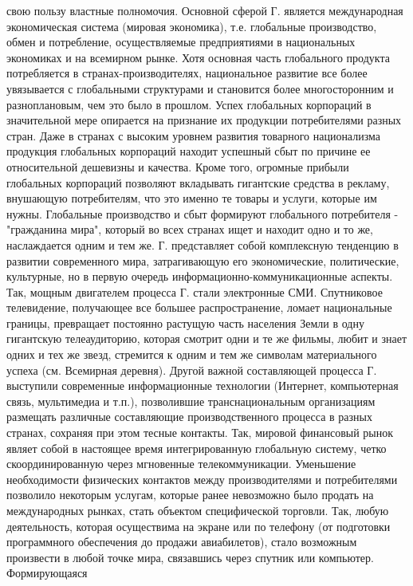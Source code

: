 \documentclass[12pt]{article}
\begin{document}
свою  пользу  властные  полномочия.  Основной  сферой  Г.  является  международная  экономическая  система
(мировая экономика), т.е. глобальные производство, обмен и потребление, осуществляемые предприятиями в
национальных экономиках и на всемирном рынке. Хотя основная часть глобального продукта потребляется в
странах-производителях,  национальное  развитие  все  более  увязывается  с  глобальными  структурами  и
становится более многосторонним и разноплановым, чем это было в прошлом. Успех глобальных корпораций в
значительной мере опирается на признание их продукции потребителями разных стран. Даже в странах с
высоким  уровнем  развития товарного национализма продукция  глобальных корпораций  находит  успешный
сбыт  по  причине  ее  относительной  дешевизны  и  качества.  Кроме  того,  огромные  прибыли  глобальных
корпораций позволяют вкладывать гигантские средства в рекламу, внушающую потребителям, что это именно
те товары и услуги, которые им нужны. Глобальные производство и сбыт формируют глобального потребителя -"гражданина мира", который во всех странах ищет и находит одно и то же, наслаждается одним и тем же. Г.
представляет  собой  комплексную  тенденцию  в  развитии  современного  мира,  затрагивающую  его
экономические, политические, культурные, но в первую очередь информационно-коммуникационные аспекты.
Так, мощным двигателем процесса Г. стали электронные СМИ. Спутниковое телевидение, получающее все
большее распространение, ломает национальные границы, превращает постоянно растущую часть населения
Земли в одну гигантскую телеаудиторию, которая смотрит одни и те же фильмы, любит и знает одних и тех же
звезд, стремится к одним и тем же символам материального успеха (см. Всемирная деревня). Другой важной
составляющей  процесса  Г.  выступили  современные  информационные  технологии  (Интернет,  компьютерная
связь,  мультимедиа  и  т.п.),  позволившие  транснациональным  организациям  размещать  различные 
составляющие  производственного  процесса  в  разных  странах,  сохраняя  при  этом  тесные  контакты.  Так,
мировой финансовый рынок являет собой в настоящее время интегрированную глобальную систему, четко
скоординированную через мгновенные телекоммуникации. Уменьшение необходимости физических контактов
между  производителями  и  потребителями  позволило  некоторым  услугам,  которые  ранее  невозможно  было
продать на международных рынках, стать объектом специфической торговли. Так, любую деятельность, которая
осуществима на экране или по телефону (от подготовки программного обеспечения до продажи авиабилетов),
стало возможным произвести в любой точке мира, связавшись через спутник или компьютер. Формирующаяся
\end{document}

